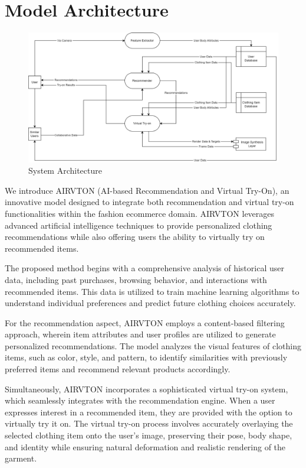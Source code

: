 \section{Model Architecture}
    \begin{figure}[h!]
        \centering
        \includegraphics[width=1\textwidth]{components/images/sys-arch.png}
        \caption{System Architecture}
        \label{fig:arch}
    \end{figure}
    We introduce AIRVTON (AI-based Recommendation and Virtual Try-On), an innovative model designed to integrate both recommendation and virtual try-on functionalities within the fashion ecommerce domain. AIRVTON leverages advanced artificial intelligence techniques to provide personalized clothing recommendations while also offering users the ability to virtually try on recommended items.

	The proposed method begins with a comprehensive analysis of historical user data, including past purchases, browsing behavior, and interactions with recommended items. This data is utilized to train machine learning algorithms to understand individual preferences and predict future clothing choices accurately.

	For the recommendation aspect, AIRVTON employs a content-based filtering approach, wherein item attributes and user profiles are utilized to generate personalized recommendations. The model analyzes the visual features of clothing items, such as color, style, and pattern, to identify similarities with previously preferred items and recommend relevant products accordingly.

	Simultaneously, AIRVTON incorporates a sophisticated virtual try-on system, which seamlessly integrates with the recommendation engine. When a user expresses interest in a recommended item, they are provided with the option to virtually try it on. The virtual try-on process involves accurately overlaying the selected clothing item onto the user's image, preserving their pose, body shape, and identity while ensuring natural deformation and realistic rendering of the garment.

